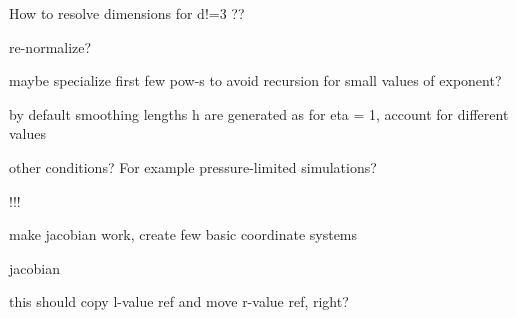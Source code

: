 \begin{DoxyRefList}
How to resolve dimensions for d!=3 ??  
\item[\label{todo__todo000017}%
\hypertarget{todo__todo000017}{}%
Member \hyperlink{classLutKernel_a91a4f8b38a4b859536bcfda2140d1585}{Lut\+Kernel\+:\+:Lut\+Kernel} (T\+Kernel \&\&source)]re-\/normalize?  
\item[\label{todo__todo000004}%
\hypertarget{todo__todo000004}{}%
Class \hyperlink{structMath_1_1Pow_3_010_01_4}{Math\+:\+:Pow$<$ 0 $>$} ]maybe specialize first few pow-\/s to avoid recursion for small values of exponent?  
\item[\label{todo__todo000002}%
\hypertarget{todo__todo000002}{}%
Member \hyperlink{classProblem_a27fca73edfbe372285fefc86f56d2718}{Problem$<$ T\+Model $>$\+:\+:init} (const int n, \hyperlink{classAbstract_1_1Distribution}{Abstract\+::\+Distribution} $\ast$distribution)]by default smoothing lengths h are generated as for eta = 1, account for different values  
\item[\label{todo__todo000001}%
\hypertarget{todo__todo000001}{}%
Member \hyperlink{classProblem_ac375fb4749fa6006cdf4705b238deed9}{Problem$<$ T\+Model $>$\+:\+:time\+Range} ]other conditions? For example pressure-\/limited simulations?  
\item[\label{todo__todo000024}%
\hypertarget{todo__todo000024}{}%
Member \hyperlink{classVariant_af2c39ddb0ac48d6e3ec1eac09c08478d}{Variant$<$ T\+Args $>$\+:\+:$\sim$\+Variant} ()]!!!  
\item[\label{todo__todo000020}%
\hypertarget{todo__todo000020}{}%
Class \hyperlink{classVectorPdfRng}{Vector\+Pdf\+Rng$<$ T\+Scalar\+Rng, T\+Pdf, T\+Jacobian $>$} ]make jacobian work, create few basic coordinate systems  
\item[\label{todo__todo000022}%
\hypertarget{todo__todo000022}{}%
Member \hyperlink{classVectorPdfRng_a4251ad37fad4cdbbbcfba87ba4997d12}{Vector\+Pdf\+Rng$<$ T\+Scalar\+Rng, T\+Pdf, T\+Jacobian $>$\+:\+:Vector\+Pdf\+Rng} (const \hyperlink{classBox}{Box} \&box, T\+Scalar\+Rng \&\&rng, T\+Pdf \&\&lambda=\mbox{[}\mbox{]}(const Vector \&) \{ return 1.\+\_\+f;\}, T\+Jacobian \&\&jacobian=\mbox{[}\mbox{]}(const Vector \&) \{ return 1.\+\_\+f;\})]jacobian  
\item[\label{todo__todo000021}%
\hypertarget{todo__todo000021}{}%
Member \hyperlink{classVectorRng_af12715177fe686a88c27cedec337cd4b}{Vector\+Rng$<$ T\+Scalar\+Rng $>$\+:\+:Vector\+Rng} (T\+Scalar\+Rng \&\&rng)]this should copy l-\/value ref and move r-\/value ref, right? 
\end{DoxyRefList}